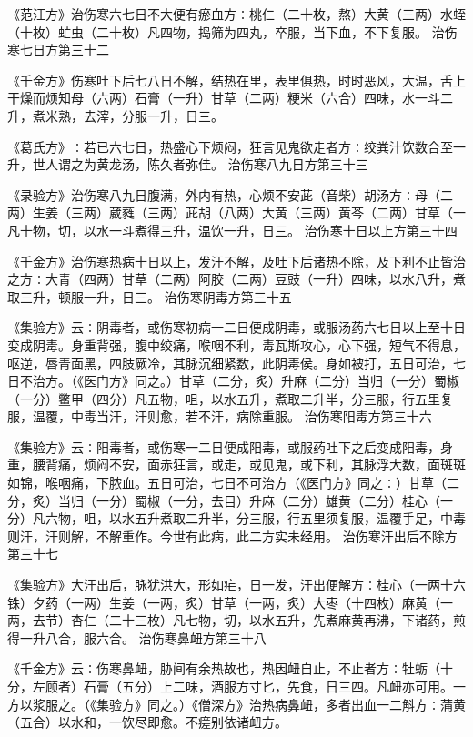 \documentclass[a4paper,12pt,UTF8,twoside]{ctexbook}
\begin{document}
《范汪方》治伤寒六七日不大便有瘀血方∶桃仁（二十枚，熬）大黄（三两）水蛭（十枚）虻虫（二十枚）凡四物，捣筛为四丸，卒服，当下血，不下复服。
治伤寒七日方第三十二

《千金方》伤寒吐下后七八日不解，结热在里，表里俱热，时时恶风，大温，舌上干燥而烦知母（六两）石膏（一升）甘草（二两）粳米（六合）四味，水一斗二升，煮米熟，去滓，分服一升，日三。

《葛氏方》∶若已六七日，热盛心下烦闷，狂言见鬼欲走者方∶绞粪汁饮数合至一升，世人谓之为黄龙汤，陈久者弥佳。
治伤寒八九日方第三十三

《录验方》治伤寒八九日腹满，外内有热，心烦不安茈（音柴）胡汤方∶母（二两）生姜（三两）葳蕤（三两）茈胡（八两）大黄（三两）黄芩（二两）甘草（一凡十物，切，以水一斗煮得三升，温饮一升，日三。
治伤寒十日以上方第三十四

《千金方》治伤寒热病十日以上，发汗不解，及吐下后诸热不除，及下利不止皆治之方∶大青（四两）甘草（二两）阿胶（二两）豆豉（一升）四味，以水八升，煮取三升，顿服一升，日三。
治伤寒阴毒方第三十五

《集验方》云∶阴毒者，或伤寒初病一二日便成阴毒，或服汤药六七日以上至十日变成阴毒。身重背强，腹中绞痛，喉咽不利，毒瓦斯攻心，心下强，短气不得息，呕逆，唇青面黑，四肢厥冷，其脉沉细紧数，此阴毒侯。身如被打，五日可治，七日不治方。（《医门方》同之。）甘草（二分，炙）升麻（二分）当归（一分）蜀椒（一分）鳖甲（四分）凡五物，咀，以水五升，煮取二升半，分三服，行五里复服，温覆，中毒当汗，汗则愈，若不汗，病除重服。
治伤寒阳毒方第三十六

《集验方》云∶阳毒者，或伤寒一二日便成阳毒，或服药吐下之后变成阳毒，身重，腰背痛，烦闷不安，面赤狂言，或走，或见鬼，或下利，其脉浮大数，面斑斑如锦，喉咽痛，下脓血。五日可治，七日不可治方（《医门方》同之∶）甘草（二分，炙）当归（一分）蜀椒（一分，去目）升麻（二分）雄黄（二分）桂心（一分）凡六物，咀，以水五升煮取二升半，分三服，行五里须复服，温覆手足，中毒则汗，汗则解，不解重作。今世有此病，此二方实未经用。
治伤寒汗出后不除方第三十七

《集验方》大汗出后，脉犹洪大，形如疟，日一发，汗出便解方∶桂心（一两十六铢）夕药（一两）生姜（一两，炙）甘草（一两，炙）大枣（十四枚）麻黄（一两，去节）杏仁（二十三枚）凡七物，切，以水五升，先煮麻黄再沸，下诸药，煎得一升八合，服六合。
治伤寒鼻衄方第三十八

《千金方》云∶伤寒鼻衄，胁间有余热故也，热因衄自止，不止者方∶牡蛎（十分，左顾者）石膏（五分）上二味，酒服方寸匕，先食，日三四。凡衄亦可用。一方以浆服之。（《集验方》同之。）《僧深方》治热病鼻衄，多者出血一二斛方∶蒲黄（五合）以水和，一饮尽即愈。不瘥别依诸衄方。
\end{document}

